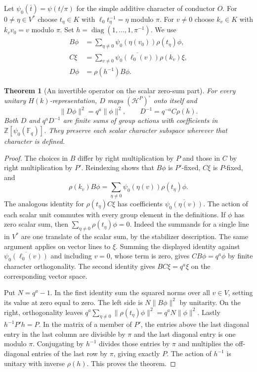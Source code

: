 \documentclass[a4paper,11pt]{article}
\newtheorem{theorem}[proposition]{Theorem}
\theoremstyle{definition}
\theoremstyle{remark}
\numberwithin{equation}{section}
\begin{document}
Let \(\psi_0(\bar t)=\psi(t/\pi)\) for the simple additive character
of conductor \(O\). For \(0\ne\eta\in V^*\) choose \(t_\eta\in K\)
with \(\ell_0t_\eta^{-1}=\eta\) modulo \(\pi\). For \(v\ne0\)
choose \(k_v\in K\) with \(k_vv_0=v\) modulo \(\pi\).
Set \(h=\operatorname{diag}(1,\ldots,1,\pi^{-1})\). We use
\[
 \begin{split}
 B\phi&=\sum_{\eta\ne0}\psi_0(\eta(v_0))\rho(t_\eta)\phi ,\\
 C\xi&=\sum_{v\ne0}\overline{\psi_0(\ell_0(v))}\rho(k_v)\xi ,
 \\
 D\phi&=\rho(h^{-1}) B\phi .
 \end{split}
\]
\begin{theorem}[An invertible operator on the scalar zero-sum part]\label{thm:incidence338}
For every unitary \(H(k)\)-representation, \(D\) maps
\((\mathcal H^P)^\circ\) onto itself and
\[
        \|D\phi\|^2=q^a\|\phi\|^2,\qquad
        D^{-1}=q^{-a}C\rho(h).
\]
Both \(D\) and \(q^aD^{-1}\) are finite sums of group actions with
coefficients in \(\mathbb Z[\psi_0(\mathbb F_q)]\). They preserve
each scalar character subspace wherever that character is defined.
\end{theorem}
\begin{proof}
The choices in \(B\) differ by right multiplication by \(P\) and those
in \(C\) by right multiplication by \(P'\). Reindexing shows that
\(B\phi\) is \(P'\)-fixed, \(C\xi\) is \(P\)-fixed, and
\[
    \rho(k_v)B\phi=
       \sum_{\eta\ne0}\psi_0(\eta(v))\rho(t_\eta)\phi .
\]
The analogous identity for \(\rho(t_\eta)C\xi\) has coefficients
\(\overline{\psi_0(\eta(v))}\). The action of each scalar unit
commutes with every group element in the definitions. If
\(\phi\) has zero scalar sum, then
\(\sum_{\eta\ne0}\rho(t_\eta)\phi=0\). Indeed the summands for a
single line in \(V^*\) are one translate of the scalar sum, by
the stabilizer description. The same argument applies on vector
lines to \(\xi\). Summing the displayed identity against
\(\overline{\psi_0(\ell_0(v))}\) and including \(v=0\), whose term
is zero, gives \(CB\phi=q^a\phi\) by finite character orthogonality.
The second identity gives \(BC\xi=q^a\xi\) on the corresponding
vector space.

Put \(N=q^a-1\). In the first identity sum the squared norms over
all \(v\in V\), setting its value at zero equal to zero. The left
side is \(N\|B\phi\|^2\) by unitarity. On the right, orthogonality
leaves \(q^a\sum_{\eta\ne0}\|\rho(t_\eta)\phi\|^2=q^aN\|\phi\|^2\).
Lastly \(h^{-1}P'h=P\). In the matrix of a member of \(P'\),
the entries above the last diagonal entry in the last column
are divisible by \(\pi\) and the last diagonal entry is one
modulo \(\pi\). Conjugating by \(h^{-1}\) divides those entries by
\(\pi\) and multiplies the off-diagonal entries of the last row
by \(\pi\), giving exactly \(P\). The action of \(h^{-1}\) is
unitary with inverse \(\rho(h)\). This proves the theorem.
\end{proof}
\end{document}

